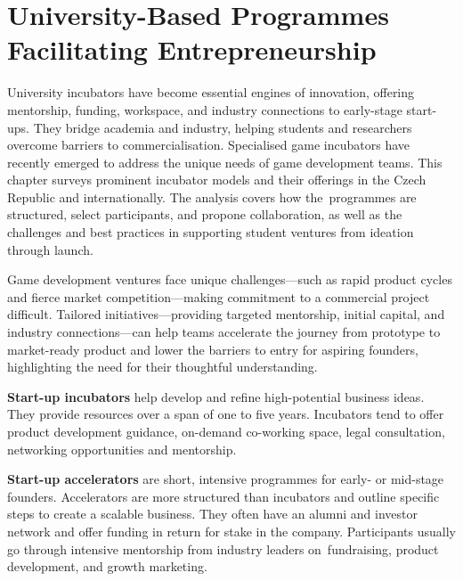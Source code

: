 \chapter{University-Based Programmes Facilitating Entrepreneurship}\label{chap:incubators}

\begin{chapterabstract}
    University incubators have become essential engines of innovation, offering mentorship, funding, workspace, and industry connections to early-stage start-ups. They bridge academia and industry, helping students and researchers overcome barriers to commercialisation. Specialised game incubators have recently emerged to address the unique needs of game development teams. This chapter surveys prominent incubator models and their offerings in the Czech Republic and internationally. The analysis covers how the~programmes are structured, select participants, and propone collaboration, as well as the challenges and best practices in supporting student ventures from ideation through launch.
\end{chapterabstract}

Game development ventures face unique challenges---such as rapid product cycles and fierce market competition---making commitment to a commercial project difficult. Tailored initiatives---providing targeted mentorship, initial capital, and industry connections---can help teams accelerate the journey from prototype to market-ready product and lower the barriers to entry for aspiring founders, highlighting the need for their thoughtful understanding.

\textbf{Start-up incubators} help develop and refine high-potential business ideas. They provide resources over a span of one to five years. Incubators tend to offer product development guidance, on-demand co-working space, legal consultation, networking opportunities and mentorship.
\cite{harward-incub-accelerator}

\textbf{Start-up accelerators} are short, intensive programmes for early- or mid-stage founders. Accelerators are more structured than incubators and outline specific steps to create a scalable business. They often have an alumni and investor network and offer funding in return for stake in the company. Participants usually go through intensive mentorship from industry leaders on~fundraising, product development, and growth marketing.
\cite{harward-incub-accelerator}

